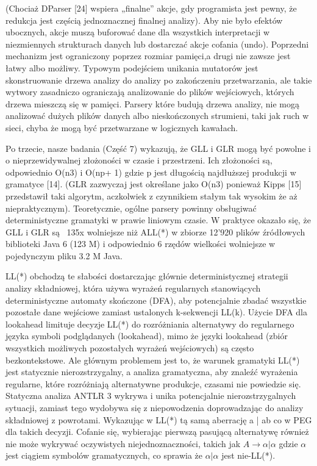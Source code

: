 (Chociaż DParser [24] wspiera „finalne” akcje, gdy programista jest pewny, że redukcja
jest częścią jednoznacznej finalnej analizy).
Aby nie było efektów ubocznych, akcje muszą buforować dane dla wszystkich interpretacji
w niezmiennych strukturach danych lub dostarczać akcje cofania (undo).
Poprzedni mechanizm jest ograniczony poprzez rozmiar pamięci,a drugi nie zawsze jest łatwy albo możliwy.
Typowym podejściem unikania mutatorów jest skonstruowanie drzewa analizy do analizy
po zakończeniu przetwarzania, ale takie wytwory zasadniczo ograniczają analizowanie
do plików wejściowych, których drzewa mieszczą się w pamięci.
Parsery które budują drzewa analizy, nie mogą analizować dużych plików danych albo
nieskończonych strumieni, taki jak ruch w sieci, chyba że mogą być przetwarzane w logicznych kawałach.
\par
Po trzecie, nasze badania (Część 7) wykazują, że GLL i GLR mogą być powolne i o nieprzewidywalnej
złożoności w czasie i przestrzeni.
Ich złożoności są, odpowiednio O(n3) i O(np+ 1) gdzie p jest długością
najdłuższej produkcji w gramatyce [14].
(GLR zazwyczaj jest określane jako O(n3) ponieważ Kipps [15] przedstawił taki algorytm,
aczkolwiek z czynnikiem stałym tak wysokim że aż niepraktycznym).
Teoretycznie, ogólne parsery powinny obsługiwać deterministyczne gramatyki w prawie liniowym czasie.
W praktyce okazało się, że GLL i GLR są ~135x wolniejsze niż ALL(*)
w zbiorze 12'920 plików źródłowych biblioteki Java 6 (123 M)
i odpowiednio 6 rzędów wielkości wolniejsze w pojedynczym pliku 3.2 M Java.
\par
LL(*) obchodzą te słabości dostarczając głównie deterministycznej strategii analizy składniowej,
która używa wyrażeń regularnych stanowiących deterministyczne automaty skończone (DFA),
aby potencjalnie zbadać wszystkie pozostałe dane wejściowe zamiast ustalonych k-sekwencji LL(k).
Użycie DFA dla lookahead limituje decyzje LL(*) do rozróżniania alternatywy do regularnego
języka symboli podglądanych (lookahead),
mimo że języki lookahead (zbiór wszystkich możliwych pozostałych wyrażeń wejściowych)
są często bezkontekstowe. Ale głównym problemem jest to, że warunek gramatyki LL(*)
jest statycznie nierozstrzygalny, a analiza gramatyczna, aby znaleźć wyrażenia regularne,
które rozróżniają alternatywne produkcje, czasami nie powiedzie się.
Statyczna analiza ANTLR 3 wykrywa i unika potencjalnie nierozstrzygalnych sytuacji,
zamiast tego wydobywa się z niepowodzenia doprowadzając do analizy składniowej z powrotami.
Wykazując w LL(*) tą samą aberrację a | ab co w PEG dla takich decyzji.
Cofanie się, wybierając pierwszą pasującą alternatywę również nie może wykrywać
oczywistych niejednoznaczności, takich jak \(A \rightarrow \alpha | \alpha \) gdzie \(\alpha\)
jest ciągiem symbolów gramatycznych, co sprawia że \(\alpha | \alpha \) jest nie-LL(*).
